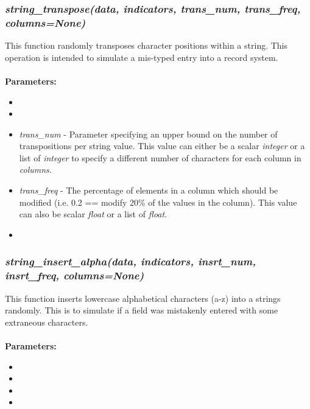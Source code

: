 \documentclass[titlepage, 11pt]{article}
\begin{document}
 
\subsubsection{\textit{string\_transpose(data, indicators, trans\_num, trans\_freq, columns=None)}}
This function randomly transposes character positions within a string. This operation is intended to simulate a mis-typed entry into a record system.
\\
\\
\textbf{Parameters:}
\begin{itemize}
    \item \docdata
    \item \docindc
    \item \textit{trans\_num} - Parameter specifying an upper bound on the number of transpositions per string value. This value can either be a scalar \textit{integer} or a list of \textit{integer} to specify a different number of characters for each column in \textit{columns}.
    \item \textit{trans\_freq} - The percentage of elements in a column which should be modified (i.e. 0.2 == modify 20\% of the values in the column). This value can also be scalar \textit{float} or a list of \textit{float}.
    \item \doccols
\end{itemize}

\subsubsection{\textit{string\_insert\_alpha(data, indicators, insrt\_num, insrt\_freq, columns=None)}}\label{stinsert}

This function inserts lowercase alphabetical characters (a-z) into a strings randomly. This is to simulate if a field was mistakenly entered with some extraneous characters. 
\\
\\
\textbf{Parameters:}
\begin{itemize}
    \item \docdata
    \item \docindc
    \item {}
    \item {}
\end{itemize}
\end{document}

